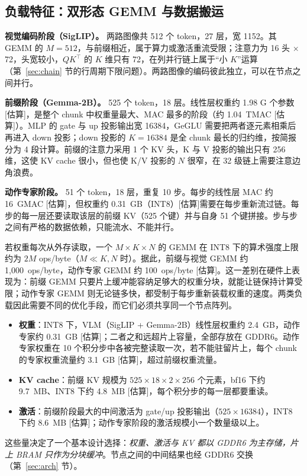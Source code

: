 \documentclass[a4paper,10.5pt]{ctexart}
\newcommand{\tE}{\textsf{[估算]}}           %
\begin{document}
\subsection{负载特征：双形态 GEMM 与数据搬运}\label{sec:wlchar}

\textbf{视觉编码阶段（SigLIP）。} 两路图像共 512 个 token，27 层，宽 1152。其 GEMM 的 $M=512$，与前缀相近，属于算力或激活重流受限；注意力为 16 头 $\times$ 72，头宽较小，$QK^\top$ 的 $K$ 维只有 72，在列并行链上属于“小 $K$”运算（第~\ref{sec:chain} 节的行周期下限问题）。两路图像的编码彼此独立，可以在节点之间并行。

\textbf{前缀阶段（Gemma-2B）。} 525 个 token，18 层。线性层权重约 1.98 G 个参数 \tE，是整个 chunk 中权重量最大、MAC 最多的阶段（约 1.04~TMAC \tE）。MLP 的 gate 与 up 投影输出宽 16384，GeGLU 需要把两者逐元素相乘后再进入 down 投影；down 投影的 $K=16384$ 是全 chunk 最长的归约维，按简报分为 4 段计算。前缀的注意力采用 1 个 KV 头，K 与 V 投影的输出只有 256 维，这使 KV cache 很小，但也使 K/V 投影的 $N$ 很窄，在 32 级链上需要注意边角浪费。

\textbf{动作专家阶段。} 51 个 token，18 层，重复 10 步。每步的线性层 MAC 约 16~GMAC \tE，但权重约 0.31~GB（INT8）\tE 需要在每步重新流过链。每步的每一层还要读取该层的前缀 KV（525 个键）并与自身 51 个键拼接。步与步之间有严格的数据依赖，只能流水、不能并行。

若权重每次从外存读取，一个 $M\times K\times N$ 的 GEMM 在 INT8 下的算术强度上限约为 $2M$ ops/byte（$M\ll K,N$ 时）。据此，前缀与视觉 GEMM 约 1,000~ops/byte，动作专家 GEMM 约 100~ops/byte \tE。这一差别在硬件上表现为：前缀 GEMM 只要片上缓冲能容纳足够大的权重分块，就能让链保持计算受限；动作专家 GEMM 则无论链多快，都受制于每步重新装载权重的速度。两类负载因此需要不同的优化手段，而它们必须共享同一个节点阵列。

\begin{itemize}
  \item \textbf{权重}：INT8 下，VLM（SigLIP + Gemma-2B）线性层权重约 2.4~GB，动作专家约 0.31~GB \tE；二者之和远超片上容量，全部存放在 GDDR6。动作专家权重在 10 个积分步中各被完整读取一次，若不能驻留片上，每个 chunk 的专家权重流量约 3.1~GB \tE，超过前缀权重流量。
  \item \textbf{KV cache}：前缀 KV 规模为 $525\times18\times2\times256$ 个元素，bf16 下约 9.7~MB、INT8 下约 4.8~MB \tE，每个积分步的每一层都要重读。
  \item \textbf{激活}：前缀阶段最大的中间激活为 gate/up 投影输出（$525\times16384$），INT8 下约 8.6~MB \tE；动作专家阶段的激活规模小一个数量级以上。
\end{itemize}
这些量决定了一个基本设计选择：\emph{权重、激活与 KV 都以 GDDR6 为主存储，片上 BRAM 只作为分块缓冲}。节点之间的中间结果也经 GDDR6 交换（第~\ref{sec:arch} 节）。
\end{document}
